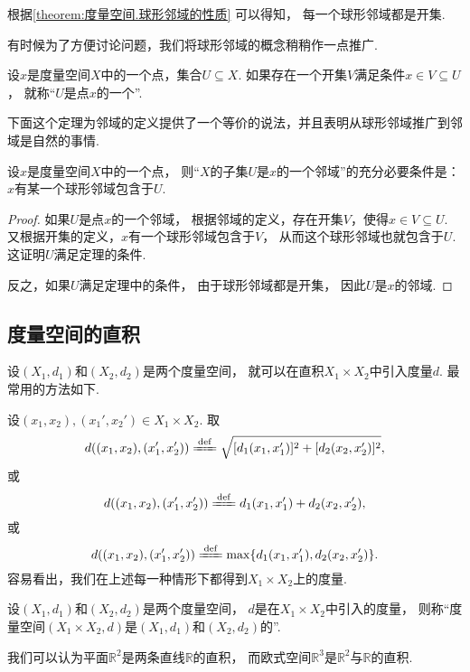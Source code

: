 根据\cref{theorem:度量空间.球形邻域的性质} 可以得知，
每一个球形邻域都是开集.

有时候为了方便讨论问题，我们将球形邻域的概念稍稍作一点推广.
\begin{definition}\label{definition:度量空间.邻域的概念}
设\(x\)是度量空间\(X\)中的一个点，集合\(U \subseteq X\).
如果存在一个开集\(V\)满足条件\(x \in V \subseteq U\)，
就称“\(U\)是点\(x\)的一个”.
\end{definition}

下面这个定理为邻域的定义提供了一个等价的说法，并且表明从球形邻域推广到邻域是自然的事情.
\begin{theorem}\label{theorem:度量空间.邻域的判定}
设\(x\)是度量空间\(X\)中的一个点，
则“\(X\)的子集\(U\)是\(x\)的一个邻域”的充分必要条件是：
\(x\)有某一个球形邻域包含于\(U\).
\begin{proof}
如果\(U\)是点\(x\)的一个邻域，
根据邻域的定义，存在开集\(V\)，使得\(x \in V \subseteq U\).
又根据开集的定义，\(x\)有一个球形邻域包含于\(V\)，
从而这个球形邻域也就包含于\(U\).
这证明\(U\)满足定理的条件.

反之，如果\(U\)满足定理中的条件，
由于球形邻域都是开集，
因此\(U\)是\(x\)的邻域.
\end{proof}
\end{theorem}

\subsection{度量空间的直积}
\begingroup
\def\A{X_1}\def\B{X_2}
\def\dA{d_1}\def\dB{d_2}
\def\X{(x_1,x_2)}
\def\Y{(x_1',x_2')}
\def\dAA{d_1(x_1,x_1')}
\def\dBB{d_2(x_2,x_2')}
设\((X_1,d_1)\)和\((X_2,d_2)\)是两个度量空间，
就可以在直积\(X_1 \times X_2\)中引入度量\(d\).
最常用的方法如下.

设\(\X,\Y\in X_1 \times X_2\).
取\[
	d(\X,\Y)
	\defeq
	\sqrt{[\dAA]^2+[\dBB]^2},
\]
或\[
	d(\X,\Y)
	\defeq
	\dAA+\dBB,
\]
或\[
	d(\X,\Y)
	\defeq
	\max\{\dAA,\dBB\}.
\]
容易看出，我们在上述每一种情形下都得到\(X_1 \times X_2\)上的度量.

\begin{definition}
设\((X_1,d_1)\)和\((X_2,d_2)\)是两个度量空间，
\(d\)是在\(X_1 \times X_2\)中引入的度量，
则称“度量空间\((X_1 \times X_2,d)\)是\((X_1,d_1)\)和\((X_2,d_2)\)的”.
\end{definition}

\begin{example}
我们可以认为平面\(\mathbb{R}^2\)是两条直线\(\mathbb{R}\)的直积，
而欧式空间\(\mathbb{R}^3\)是\(\mathbb{R}^2\)与\(\mathbb{R}\)的直积.
\end{example}
\endgroup

